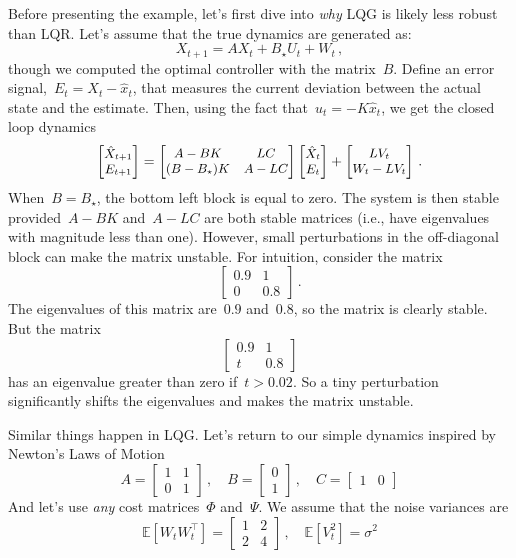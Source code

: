 \documentclass{tufte-book}
\begin{document}
Before presenting the example, let's first dive into \emph{why} LQG is
likely less robust than LQR. Let's assume that the true dynamics are
generated as: \[
    X_{t+1} = AX_t + B_\star U_t + W_t \,,
\] though we computed the optimal controller with the matrix~\(B\).
Define an error signal,~\(E_t = X_t - \hat{x}_t\), that measures the
current deviation between the actual state and the estimate. Then, using
the fact that~\(u_t = -K \hat{x}_t\), we get the closed loop dynamics \[
\small
 \begin{bmatrix}
        \hat{X}_{t+1}\\
        E_{t+1}
    \end{bmatrix} = \begin{bmatrix} A-BK & LC\\ (B-B_\star) K & A-LC \end{bmatrix}\begin{bmatrix}
        \hat{X}_t\\
        E_t
    \end{bmatrix} +
    \begin{bmatrix} LV_t\\ W_t-LV_t \end{bmatrix}\,.
\] When~\(B=B_\star\), the bottom left block is equal to zero. The
system is then stable provided~\(A-BK\) and~\(A-LC\) are both stable
matrices (i.e., have eigenvalues with magnitude less than one). However,
small perturbations in the off-diagonal block can make the matrix
unstable. For intuition, consider the matrix \[
 \begin{bmatrix} 0.9 & 1\\ 0 & 0.8 \end{bmatrix}\,.
\] The eigenvalues of this matrix are~\(0.9\) and~\(0.8\), so the matrix
is clearly stable. But the matrix \[
 \begin{bmatrix} 0.9 & 1\\ t & 0.8 \end{bmatrix}
\] has an eigenvalue greater than zero if~\(t>0.02\). So a tiny
perturbation significantly shifts the eigenvalues and makes the matrix
unstable.

Similar things happen in LQG. Let's return to our simple dynamics
inspired by Newton's Laws of Motion \[
    A = \begin{bmatrix} 1 & 1\\ 0 & 1\end{bmatrix} \,,\quad B = \begin{bmatrix} 0\\1 \end{bmatrix}\,, \quad C= \begin{bmatrix} 1 & 0\end{bmatrix}
\] And let's use \emph{any} cost matrices~\(\Phi\) and~\(\Psi\). We
assume that the noise variances are \[
    \mathbb{E}\left[W_t W_t^\top\right]=\begin{bmatrix} 1 & 2 \\ 2 & 4\end{bmatrix} \,,\quad \mathbb{E}\left[V_t^2\right]=\sigma^2
\]
\end{document}
